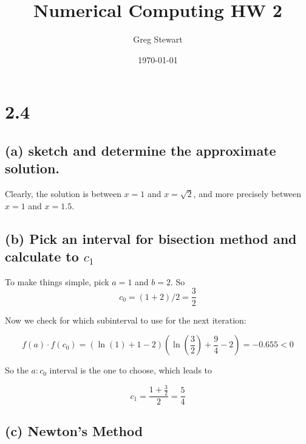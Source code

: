 \documentclass{article}[12pt]
\title{Numerical Computing HW 2}
\author{Greg Stewart}
\date{\today}
\begin{document}
\maketitle

\section*{2.4}

\subsection*{(a) \normalsize sketch and determine the approximate solution.}

\begin{center}
\end{center}

Clearly, the solution is between $x=1$ and $x=\sqrt{2}$, and more precisely between $x=1$ and $x=1.5$.

\subsection*{(b) \normalsize Pick an interval for bisection method and calculate to $c_1$}

To make things simple, pick $a = 1$ and $b = 2$. So $$c_0 = (1+2)/2 = \frac{3}{2}$$

Now we check for which subinterval to use for the next iteration:

$$f(a)\cdot f(c_0) = (\ln(1) + 1 - 2) (\ln(\frac{3}{2}) + \frac{9}{4} - 2) = -0.655 < 0$$

So the $a : c_0$ interval is the one to choose, which leads to

$$c_1 = \frac{1+\frac{3}{2}}{2} = \frac{5}{4}$$

\subsection*{(c) \normalsize Newton's Method}
\end{document}

